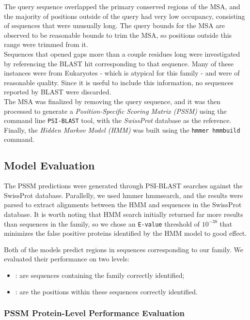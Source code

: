 \documentclass[10pt,twocolumn,letterpaper]{article}
\begin{document}
The query sequence overlapped the primary conserved regions of the MSA, and the majority of positions outside of the query had very low occupancy, consisting of sequences that were unusually long. The query bounds for the MSA are observed to be reasonable bounds to trim the MSA, so positions outside this range were trimmed from it. \\

Sequences that opened gaps more than a couple residues long were investigated by referencing the BLAST hit corresponding to that sequence. Many of these instances were from Eukaryotes - which is atypical for this family - and were of reasonable quality. Since it is useful to include this information, no sequences reported by BLAST were discarded. \\

The MSA was finalized by removing the query sequence, and it was then processed to generate a \textit{Position-Specific Scoring Matrix (PSSM)} using the command line \texttt{PSI-BLAST} tool, with the \textit{SwissProt} database as the reference. Finally, the \textit{Hidden Markov Model (HMM)} was built using the \texttt{hmmer hmmbuild} command.

\subsection{Model Evaluation}

The PSSM predictions were generated through PSI-BLAST searches against the SwissProt database.
Parallelly, we used hmmer hmmsearch, and the results were parsed to extract alignments between the HMM and sequences in the SwissProt database. It is worth noting that HMM search initially returned far more results than sequences in the family, so we chose an \texttt{E-value} threshold of \(10^{-38}\) that minimizes the false positive proteins identified by the HMM model to good effect.

Both of the models predict regions in sequences corresponding to our family. We evaluated their performance on two levels:
\begin{itemize}
    \item {}: are sequences containing the family correctly identified;
    \item {}: are the positions within these sequences correctly identified.
\end{itemize}

\subsubsection{PSSM Protein-Level Performance Evaluation}
\end{document}
